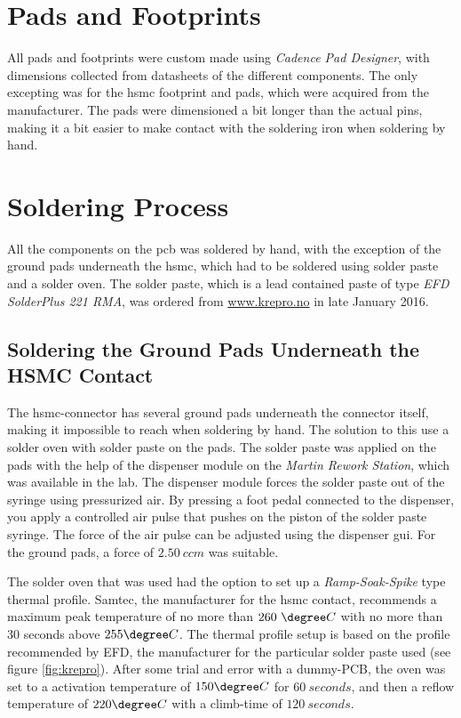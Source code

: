 \documentclass[main.tex]{subfiles}
\begin{document}

\section{Pads and Footprints}

All pads and footprints were custom made using \textit{Cadence Pad Designer}, with dimensions collected from datasheets of the different components. The only excepting was for the \gls{hsmc} footprint and pads, which were acquired from the manufacturer. The pads were dimensioned a bit longer than the actual pins, making it a bit easier to make contact with the soldering iron when soldering by hand.

\section{Soldering Process}

All the components on the \gls{pcb} was soldered by hand, with the exception of the ground pads underneath the \gls{hsmc}, which had to be soldered using solder paste and a solder oven. The solder paste, which is a lead contained paste of type \textit{EFD SolderPlus 221 RMA}, was ordered from \url{www.krepro.no} in late January 2016.

\subsection{Soldering the Ground Pads Underneath the HSMC Contact}

The \gls{hsmc}-connector has several ground pads underneath the connector itself, making it impossible to reach when soldering by hand. The solution to this use a solder oven with solder paste on the pads. The solder paste was applied on the pads with the help of the dispenser module on the \textit{Martin Rework Station}, which was available in the lab. The dispenser module forces the solder paste out of the syringe using pressurized air. By pressing a foot pedal connected to the dispenser, you apply a controlled air pulse that pushes on the piston of the solder paste syringe. The force of the air pulse can be adjusted using the dispenser \gls{gui}. For the ground pads, a force of $2.50~ccm$ was suitable.

The solder oven that was used had the option to set up a \textit{Ramp-Soak-Spike} type thermal profile. Samtec, the manufacturer for the \gls{hsmc} contact, recommends a maximum peak temperature of no more than $260~\degree C$ with no more than 30 seconds above $255\degree C$. The thermal profile setup is based on the profile recommended by EFD, the manufacturer for the particular solder paste used (see figure \ref{fig:krepro}). After some trial and error with a dummy-PCB, the oven was set to a activation temperature of $150\degree C$ for $60~seconds$, and then a reflow temperature of $220\degree C$ with a climb-time of $120~seconds$. 
\end{document}
